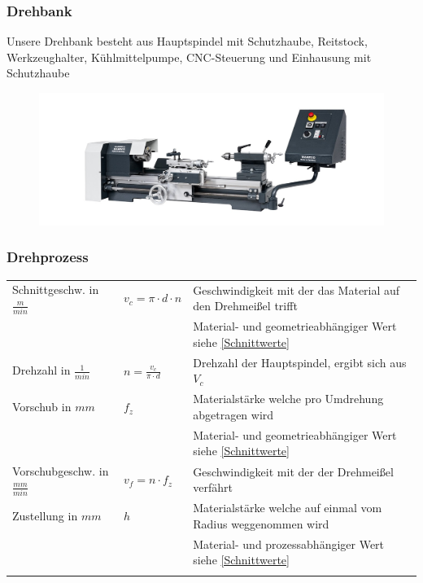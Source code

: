\documentclass{\basedir/fablab-document}
\begin{document}
\subsubsection{Drehbank}
Unsere Drehbank besteht aus Hauptspindel mit Schutzhaube, Reitstock, Werkzeughalter, Kühlmittelpumpe, CNC-Steuerung und Einhausung mit Schutzhaube
\begin{figure}[ht]
\centering
\includegraphics[width = 0.9\linewidth]{img/drehbank} \\
\end{figure}


\subsubsection{Drehprozess}
\begin{tabular}{lll}
    Schnittgeschw. in $\frac{m}{min}$ 	& $v_c = \pi \cdot d \cdot n $ 			& Geschwindigkeit mit der das Material auf den Drehmeißel trifft 	\\ 
																								&																		& Material- und geometrieabhängiger Wert siehe \ref{Schnittwerte} \\ \addlinespace
		Drehzahl in $\frac{1}{min}$ 								& $ n = \frac{v_c}{\pi \cdot d} $		& Drehzahl der Hauptspindel, ergibt sich aus $V_c$								\\ \addlinespace
		Vorschub in $mm$ 														& $ f_z $  					& Materialstärke welche pro Umdrehung abgetragen wird 						\\
																								&																		& Material- und geometrieabhängiger Wert siehe \ref{Schnittwerte} \\ \addlinespace
		Vorschubgeschw. in $\frac{mm}{min}$ & $ v_f = n \cdot f_z $ 						& Geschwindigkeit mit der der Drehmeißel verfährt			 						\\ \addlinespace
		Zustellung in $mm$ 													& $ h  $  								& Materialstärke welche auf einmal vom Radius weggenommen wird		\\
																								&																		& Material- und prozessabhängiger Wert siehe \ref{Schnittwerte} 	\\ \addlinespace
\end{tabular}
\end{document}

